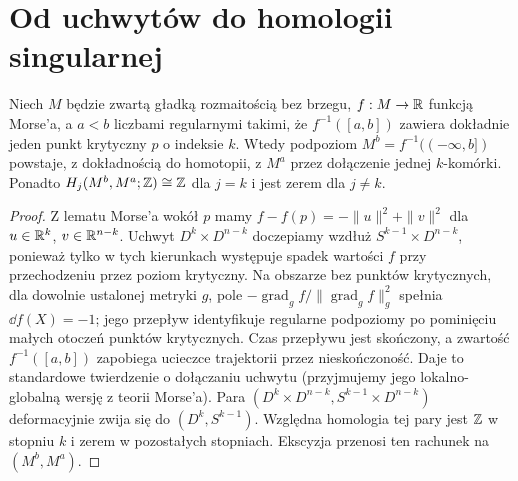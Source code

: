 \section{Od uchwytów do homologii singularnej}
\begin{twierdzenie}
\label{thm:morse-handle-v10}
Niech $M$ będzie zwartą gładką rozmaitością bez brzegu,
$f:M\to\mathbb{R}$ funkcją Morse'a, a $a<b$ liczbami regularnymi
takimi, że $f^{-1}([a,b])$ zawiera dokładnie jeden punkt
krytyczny $p$ o indeksie $k$.
Wtedy podpoziom $M^b=f^{-1}(( -\infty,b])$ powstaje,
z dokładnością do homotopii, z $M^a$ przez dołączenie
jednej $k$-komórki. Ponadto
$H_j(M^b,M^a;\mathbb{Z})\cong\mathbb{Z}$ dla $j=k$ i jest zerem
dla $j\ne k$.
\end{twierdzenie}
\begin{proof}
Z lematu Morse'a wokół $p$ mamy $f-f(p)=-\|u\|^2+\|v\|^2$
dla $u\in\mathbb{R}^k$, $v\in\mathbb{R}^{n-k}$. Uchwyt
$D^k\times D^{n-k}$ doczepiamy wzdłuż
$S^{k-1}\times D^{n-k}$, ponieważ tylko w tych kierunkach
występuje spadek wartości $f$ przy przechodzeniu
przez poziom krytyczny. Na obszarze bez punktów krytycznych, dla dowolnie ustalonej
metryki $g$, pole $-\operatorname{grad}_g f/\|\operatorname{grad}_g f\|_g^2$
spełnia $\dd f(X)=-1$; jego przepływ identyfikuje regularne
podpoziomy po pominięciu małych otoczeń punktów krytycznych.
Czas przepływu jest skończony, a zwartość $f^{-1}([a,b])$
zapobiega ucieczce trajektorii przez nieskończoność.
Daje to standardowe twierdzenie o dołączaniu uchwytu
(przyjmujemy jego lokalno-globalną wersję z teorii Morse'a).
Para $(D^k\times D^{n-k},S^{k-1}\times D^{n-k})$
deformacyjnie zwija się do $(D^k,S^{k-1})$.
Względna homologia tej pary jest $\mathbb{Z}$ w stopniu $k$
i zerem w pozostałych stopniach. Ekscyzja przenosi
ten rachunek na $(M^b,M^a)$.
\end{proof}

